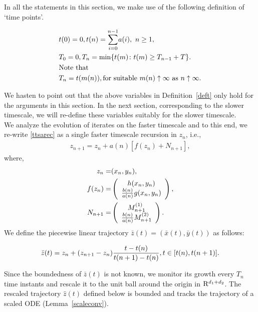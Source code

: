 In all the statements in this section, we make use of the following definition of `time points'.
\begin{definition}\label{deft}
\begin{align}
&t(0)=0,t(n)=\overset{n-1}{\underset{i=0}{\sum}} a(i), \mbox{ } n\geq 1,\nonumber\\
&T_0=0, T_{n}=\min \{t(m) \colon t(m)\geq T_{n-1}+T\}.\nonumber\\
&\text{Note that}\nonumber\\
&T_n=t(m(n)), \mbox{for suitable } m(n)  \uparrow \infty  \mbox{ }\text{as} \mbox{ } n\uparrow \infty.
\end{align}
\end{definition}
We hasten to point out that the above variables in Definition~\ref{deft} only hold for the arguments 
in this section. In the next section, corresponding to the slower timescale, we will re-define these 
variables suitably for the slower timescale.\\
\indent We analyze the evolution of iterates on the faster timescale and to this end, we re-write 
\eqref{ttsarec} as a single faster timescale recursion in $z_n$, i.e.,
\begin{align}
\label{combo}z_{n+1}=z_n+a(n)[f(z_n)+N_{n+1}],
\end{align}
where,
\begin{align}
z_n=&(x_n,y_n),\nonumber\\
f(z_n)=&\left({\begin{array}{c} h(x_n,y_n) \\ \frac{b(n)}{a(n)}g(x_n,y_n) \end{array}}\right),\nonumber\\
N_{n+1}=&\left({\begin{array}{c}M^{(1)}_{n+1}\\ \frac{b(n)}{a(n)}M^{(2)}_{n+1}\end{array}} \right).\nonumber
\end{align}
We define the piecewise linear trajectory $\bar{z}(t)=(\bar{x}(t),\bar{y}(t))$ as follows:
\begin{definition}\label{defpl}
\begin{align}
\bar{z}(t)=z_n +(z_{n+1}-z_n)\frac{t-t(n)}{t(n+1)-t(n)}, t \in [t(n),t(n+1)].\nonumber
\end{align}
\end{definition}
Since the boundedness of $\bar{z}(t)$ is not known, we monitor its growth every $T_n$ time instants and rescale it to the unit ball around the origin in $\mathrm{R}^{d_1+d_2}$. The rescaled trajectory $\hat{z}(t)$ defined below is bounded and tracks the trajectory of a scaled ODE (Lemma~\ref{scaleconv}).
